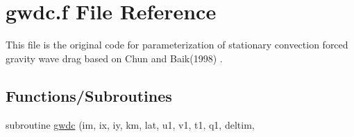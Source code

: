 \hypertarget{gwdc_8f}{}\section{gwdc.\+f File Reference}
\label{gwdc_8f}


This file is the original code for parameterization of stationary convection forced gravity wave drag based on Chun and Baik(1998) \cite{chun_and_baik_1998}.  


\subsection*{Functions/\+Subroutines}
\textbf{ }\par
\begin{DoxyCompactItemize}
\item 
subroutine \hyperlink{group___g_f_s__cgwd_ga722b7730110e3c91524ccf414eab9dfe}{gwdc} (im, ix, iy, km, lat, u1, v1, t1, q1, deltim,
\end{DoxyCompactItemize}

